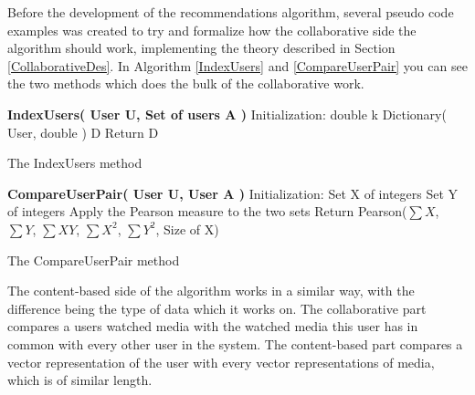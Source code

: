 Before the development of the recommendations algorithm, several pseudo code examples was created to try and formalize how the collaborative side the algorithm should work, implementing the theory described in Section \ref{CollaborativeDes}. In Algorithm \ref{IndexUsers} and \ref{CompareUserPair} you can see the two methods which does the bulk of the collaborative work.

\begin{algorithm}[H]
	\DontPrintSemicolon
	\;
	\textbf{IndexUsers( User U, Set of users A )}\;
	Initialization:\;
	double k\;
	Dictionary( User, double ) D\;
	Return D\;
	\label{IndexUsers}
	\caption{The IndexUsers method}
\end{algorithm}


\begin{algorithm}[H]
	\DontPrintSemicolon
	\;
	\textbf{CompareUserPair( User U, User A )}\;
	Initialization:\;
	Set X of integers\;
	Set Y of integers\;
	Apply the Pearson measure to the two sets
	Return Pearson($\sum{X}$, $\sum{Y}$, $\sum{XY}$, $\sum{X^2}$, $\sum{Y^2}$, Size of X)
	\label{CompareUserPair}
	\caption{The CompareUserPair method}
\end{algorithm}

The content-based side of the algorithm works in a similar way, with the difference being the type of data which it works on. The collaborative part compares a users watched media with the watched media this user has in common with every other user in the system. The content-based part compares a vector representation of the user with every vector representations of media, which is of similar length.
